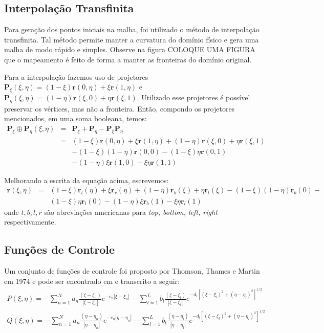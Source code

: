 \documentclass{article}
\begin{document}
		\subsection{Interpolação Transfinita} %
		\label{sub:interpola_o_transfinita}
			Para geração dos pontos iniciais na malha, foi utilizado o método de interpolação transfinita. Tal método permite manter a curvatura do domínio físico e gera uma malha de modo rápido e simples. Observe na figura COLOQUE UMA FIGURA que o mapeamento é feito de forma a manter as fronteiras do domínio original.

			Para a interpolação fazemos uso de projetores $\mathbf{P}_{\xi}(\xi, \eta) = (1-\xi)\mathbf{r}(0,\eta) + \xi\mathbf{r}(1,\eta)$ e $\mathbf{P}_{\eta}(\xi, \eta) = (1-\eta)\mathbf{r}(\xi,0) + \eta\mathbf{r}(\xi,1)$. Utilizado esse projetores é possível preservar os vértices, mas não a fronteira. Então, compondo os projetores mencionados, em uma soma booleana, temos:
			\begin{eqnarray*}
				\mathbf{P}_\xi \oplus \mathbf{P}_\eta(\xi, \eta) &=& \mathbf{P}_\xi + \mathbf{P}_\eta - \mathbf{P}_\xi\mathbf{P}_\eta \\
						 &=& (1-\xi)\mathbf{r}(0,\eta) + \xi\mathbf{r}(1,\eta) + (1-\eta)\mathbf{r}(\xi,0) + \eta\mathbf{r}(\xi,1)\\
						&&- (1-\xi)(1-\eta)\mathbf{r}(0,0) - (1-\xi)\eta\mathbf{r}(0,1)\\
						&&- (1-\eta)\xi\mathbf{r}(1,0) - \xi\eta\mathbf{r}(1,1)
			\end{eqnarray*}

			Melhorando a escrita da equação acima, escrevemos:
			\begin{eqnarray*}
						\mathbf{r}(\xi,\eta)&=& (1-\xi)\mathbf{r}_l(\eta) + \xi\mathbf{r}_r(\eta) + (1-\eta)\mathbf{r}_b(\xi) + \eta\mathbf{r}_l(\xi) - (1-\xi)(1-\eta)\mathbf{r}_b(0) - \\
						&&(1-\xi)\eta\mathbf{r}_l(0) - (1-\eta)\xi\mathbf{r}_b(1) - \xi\eta\mathbf{r}_l(1)
			\end{eqnarray*}
			onde $t,b,l,r$ são abreviações americanas para \emph{top, bottom, left, right} respectivamente.

		\subsection{Funções de Controle} %
		\label{sub:fun_es_de_controle}
			Um conjunto de funções de controle foi proposto por Thomson, Thames e Martin em 1974 e pode ser encontrado em \cite{farrashkhalvat2003basic} e transcrito a seguir:
			\begin{eqnarray}
				P(\xi,\eta) = -\sum_{n=1}^N a_n \frac{(\xi - \xi_n)}{|\xi - \xi_n|}e^{-c_n |\xi-\xi_n|} - \sum_{l=1}^{L}b_l \frac{(\xi - \xi_l)}{|\xi - \xi_l|}e^{-d_l [(\xi-\xi_l)^2 + (\eta-\eta_l)^2]^{1/2}} \\
				Q(\xi,\eta) = -\sum_{n=1}^N a_n \frac{(\eta - \eta_n)}{|\eta - \eta_n|}e^{-c_n |\eta-\eta_n|} - \sum_{l=1}^{L}b_l \frac{(\eta - \eta_l)}{|\eta - \eta_l|}e^{-d_l [(\xi-\xi_l)^2 + (\eta-\eta_l)^2]^{1/2} }
			\end{eqnarray}
\end{document}

